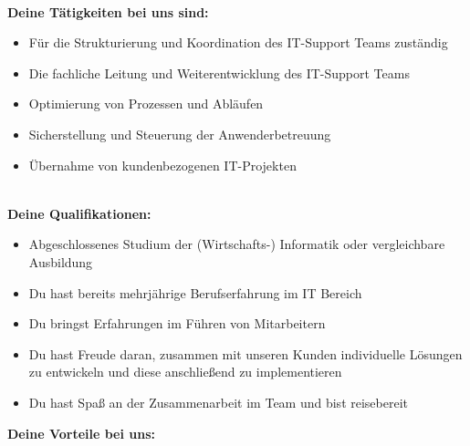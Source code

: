\documentclass[12pt,utf8]{scrartcl}
\begin{document}
\begin{flushleft}
\textbf{\\Deine Tätigkeiten bei uns sind:}
\begin{center}
	\begin{itemize}
		\item Für die Strukturierung und Koordination des IT-Support Teams zuständig
		\item Die fachliche Leitung und Weiterentwicklung des IT-Support Teams
		\item Optimierung von Prozessen und Abläufen 
		\item Sicherstellung und Steuerung der Anwenderbetreuung
		\item Übernahme von kundenbezogenen IT-Projekten
	\end{itemize}
\end{center}

\textbf{\\Deine Qualifikationen:}
\begin{center}
	\begin{itemize}
		\item Abgeschlossenes Studium der (Wirtschafts-) Informatik oder vergleichbare Ausbildung
		\item Du hast bereits mehrjährige Berufserfahrung im IT Bereich
		\item Du bringst Erfahrungen im Führen von Mitarbeitern
		\item Du hast Freude daran, zusammen mit unseren Kunden individuelle Lösungen zu entwickeln und diese anschließend zu implementieren
		\item Du hast Spaß an der Zusammenarbeit im Team und bist reisebereit
	\end{itemize}
\end{center}

\begin{center}
	\textbf{Deine Vorteile bei uns:}
\end{center}


\end{flushleft}
\end{document}
